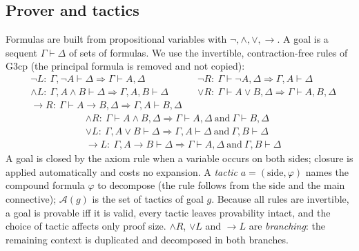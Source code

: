 \subsection{Prover and tactics}
Formulas are built from  propositional variables with $\neg,\wedge,\vee,\rightarrow$. A goal is a sequent $\Gamma\vdash\Delta$ of sets of formulas. We use the invertible, contraction-free rules of G3cp (the principal formula is removed and not copied):
\begin{align*}
&\neg L:\ \Gamma,\neg A\vdash\Delta \Rightarrow \Gamma\vdash A,\Delta &&\neg R:\ \Gamma\vdash\neg A,\Delta\Rightarrow \Gamma,A\vdash\Delta\\
&\wedge L:\ \Gamma,A\wedge B\vdash\Delta\Rightarrow\Gamma,A,B\vdash\Delta &&\vee R:\ \Gamma\vdash A\vee B,\Delta\Rightarrow\Gamma\vdash A,B,\Delta\\
&\rightarrow R:\ \Gamma\vdash A\rightarrow B,\Delta\Rightarrow\Gamma,A\vdash B,\Delta
\end{align*}
\begin{align*}
&\wedge R:\ \Gamma\vdash A\wedge B,\Delta\Rightarrow \Gamma\vdash A,\Delta\ \text{and}\ \Gamma\vdash B,\Delta\\
&\vee L:\ \Gamma,A\vee B\vdash\Delta\Rightarrow \Gamma,A\vdash\Delta\ \text{and}\ \Gamma,B\vdash\Delta\\
&\rightarrow L:\ \Gamma,A\rightarrow B\vdash\Delta\Rightarrow \Gamma\vdash A,\Delta\ \text{and}\ \Gamma,B\vdash\Delta
\end{align*}
A goal is closed by the axiom rule when a variable occurs on both sides; closure is applied automatically and costs no expansion. A \emph{tactic} $a=(\text{side},\varphi)$ names the compound formula $\varphi$ to decompose (the rule follows from the side and the main connective); $\mathcal{A}(g)$ is the set of tactics of goal $g$. Because all rules are invertible, a goal is provable iff it is valid, every tactic leaves provability intact, and the choice of tactic affects only proof size. $\wedge R$, $\vee L$ and $\rightarrow L$ are \emph{branching}: the remaining context is duplicated and decomposed in both branches.


